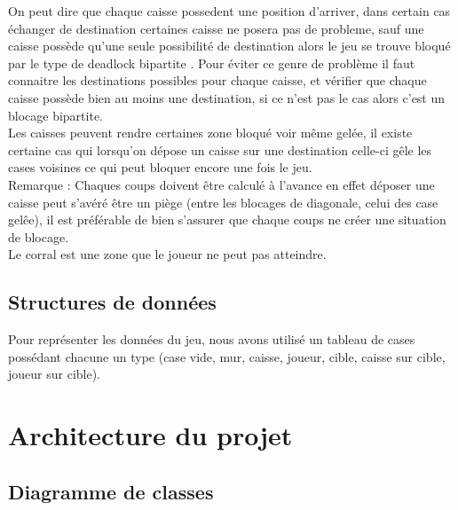 \documentclass[a4paper, 11pt]{report}
\begin{document}
On peut dire que chaque caisse possedent une position d'arriver, dans certain cas échanger de destination certaines caisse ne posera pas de probleme, sauf une caisse possède qu'une seule possibilité de destination alors le jeu se trouve bloqué par le type de deadlock \og bipartite \fg{}. Pour éviter ce genre de problème il faut connaitre les destinations possibles pour chaque caisse, et vérifier que chaque caisse possède bien au moins une destination, si ce n'est pas le cas alors c'est un blocage bipartite.\\

Les caisses peuvent rendre certaines zone bloqué voir même gelée, il existe certaine cas qui lorsqu'on dépose un caisse sur une destination celle-ci gêle les cases voisines ce qui peut bloquer encore une fois le jeu. \\

Remarque : Chaques coups doivent être calculé à l'avance en effet déposer une caisse peut s'avéré être un piège (entre les blocages de diagonale, celui des case gelêe), il est préférable de bien s'assurer que chaque coups ne créer une situation de blocage.\\

\label{corral}
Le corral est une zone que le joueur ne peut pas atteindre.\\

\section{Structures de données}

Pour représenter les données du jeu, nous avons utilisé un tableau de cases possédant chacune un type (case vide, mur, caisse, joueur, cible, caisse sur cible, joueur sur cible).

\chapter{Architecture du projet}

\section{Diagramme de classes}
\end{document}
